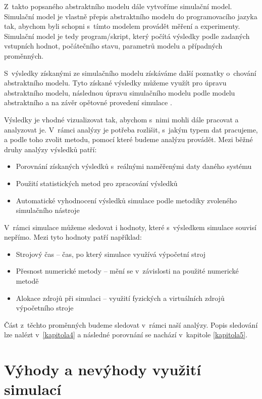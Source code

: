 Z~takto popsaného abstraktního modelu dále vytvoříme simulační model. Simulační model je vlastně přepis abstraktního modelu do programovacího jazyka tak, abychom byli schopni s~tímto modelem provádět měření a experimenty. Simulační model je tedy program/skript, který počítá výsledky podle zadaných vstupních hodnot, počátečního stavu, parametrů modelu a případných proměnných.

S~výsledky získanými ze simulačního modelu získáváme další poznatky o~chování abstraktního modelu. Tyto získané výsledky můžeme využít pro úpravu abstraktního modelu, následnou úpravu simulačního modelu podle modelu abstraktního a na závěr opětovné provedení simulace \cite{IMS-skripta}.

Výsledky je vhodné vizualizovat tak, abychom s~nimi mohli dále pracovat a analyzovat je. V~rámci analýzy je potřeba rozlišit, s~jakým typem dat pracujeme, a podle toho zvolit metodu, pomocí které budeme analýzu provádět. Mezi běžné druhy analýzy výsledků patří:
\begin{itemize}
    \item Porovnání získaných výsledků s~reálnými naměřenými daty daného systému
    \item Použití statistických metod pro zpracování výsledků
    \item Automatické vyhodnocení výsledků simulace podle metodiky zvoleného simulačního nástroje
\end{itemize}

V~rámci simulace můžeme sledovat i hodnoty, které s~výsledkem simulace souvisí nepřímo. Mezi tyto hodnoty patří například:
\begin{itemize}
    \item Strojový čas -- čas, po který simulace využívá výpočetní stroj
    \item Přesnost numerické metody -- mění se v~závislosti na použité numerické metodě
    \item Alokace zdrojů při simulaci -- využití fyzických a virtuálních zdrojů výpočetního stroje
\end{itemize}


Část z~těchto proměnných budeme sledovat v~rámci naší analýzy. Popis sledování lze nalézt v~\ref{kapitola4} a následné porovnání se nachází v~kapitole \ref{kapitola5}.

\section{Výhody a nevýhody využití simulací}

